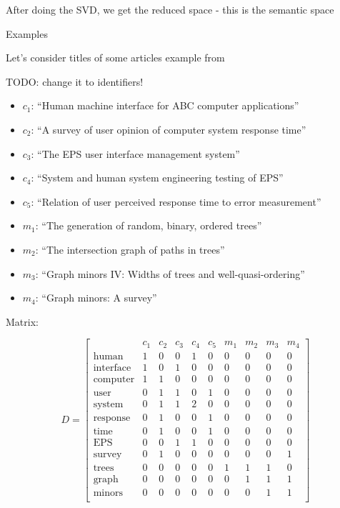 After doing the SVD, we get the reduced space - this is the semantic
space

Examples

Let's consider titles of some articles example from \cite{landauer1998introduction} \cite{deerwester1990indexing}


TODO: change it to identifiers!

\begin{itemize}
\itemsep1pt\parskip0pt
\item
  $c_1$: ``Human machine interface for ABC computer applications''
\item
  $c_2$: ``A survey of user opinion of computer system response
  time''
\item
  $c_3$: ``The EPS user interface management system''
\item
  $c_4$: ``System and human system engineering testing of EPS''
\item
  $c_5$: ``Relation of user perceived response time to error
  measurement''
\item
  $m_1$: ``The generation of random, binary, ordered trees''
\item
  $m_2$: ``The intersection graph of paths in trees''
\item
  $m_3$: ``Graph minors IV: Widths of trees and well-quasi-ordering''
\item
  $m_4$: ``Graph minors: A survey''
\end{itemize}

Matrix:

$$D =
\left[\begin{array}{c|ccccccccc}
 & c_1 & c_2 & c_3 & c_4 & c_5 & m_1 & m_2 & m_3 & m_4 \\
\hline
\text{human} & 1 & 0 & 0 & 1 & 0 & 0 & 0 & 0 & 0 \\
\text{interface} & 1 & 0 & 1 & 0 & 0 & 0 & 0 & 0 & 0 \\
\text{computer} & 1 & 1 & 0 & 0 & 0 & 0 & 0 & 0 & 0 \\
\text{user} & 0 & 1 & 1 & 0 & 1 & 0 & 0 & 0 & 0 \\
\text{system} & 0 & 1 & 1 & 2 & 0 & 0 & 0 & 0 & 0 \\
\text{response} & 0 & 1 & 0 & 0 & 1 & 0 & 0 & 0 & 0 \\
\text{time} & 0 & 1 & 0 & 0 & 1 & 0 & 0 & 0 & 0 \\
\text{EPS} & 0 & 0 & 1 & 1 & 0 & 0 & 0 & 0 & 0 \\
\text{survey} & 0 & 1 & 0 & 0 & 0 & 0 & 0 & 0 & 1 \\
\text{trees} & 0 & 0 & 0 & 0 & 0 & 1 & 1 & 1 & 0 \\
\text{graph} & 0 & 0 & 0 & 0 & 0 & 0 & 1 & 1 & 1 \\
\text{minors} & 0 & 0 & 0 & 0 & 0 & 0 & 0 & 1 & 1 \\
\end{array} \right] $$

